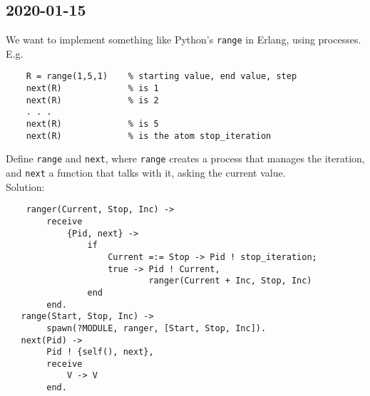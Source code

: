 \subsection{2020-01-15}
We want to implement something like Python’s \texttt{range} in Erlang, using processes. \\
E.g. 
\begin{lstlisting}
    R = range(1,5,1)    % starting value, end value, step
    next(R)             % is 1
    next(R)             % is 2
    . . .
    next(R)             % is 5
    next(R)             % is the atom stop_iteration
\end{lstlisting}
Define \texttt{range} and \texttt{next}, where \texttt{range} creates a process that manages the iteration, and \texttt{next} a function that
talks with it, asking the current value. \\
Solution:
\begin{lstlisting}
    ranger(Current, Stop, Inc) ->
        receive
            {Pid, next} ->
                if
                    Current =:= Stop -> Pid ! stop_iteration;
                    true -> Pid ! Current,
                            ranger(Current + Inc, Stop, Inc)
                end 
        end.
   range(Start, Stop, Inc) ->
        spawn(?MODULE, ranger, [Start, Stop, Inc]).
   next(Pid) ->
        Pid ! {self(), next},
        receive
            V -> V
        end.
\end{lstlisting}




